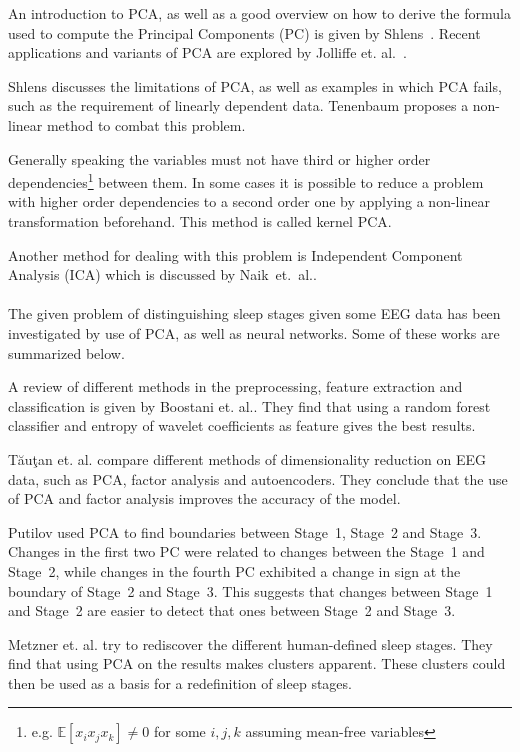 \documentclass[a4paper]{IEEEtran}
\begin{document}
An introduction to PCA, as well as a good overview on how to derive the formula used to compute the Principal Components (PC) is given by Shlens~\cite{Shlens2014}.
Recent applications and variants of PCA are explored by Jolliffe et. al.~\cite{Jolliffe2016}.

Shlens discusses the limitations of PCA, as well as examples in which PCA fails, such as the requirement of linearly dependent data.
Tenenbaum proposes a non-linear method to combat this problem\cite{Tenenbaum2000}.

Generally speaking the variables must not have third or higher order dependencies\footnote{e.g. $\mathbb{E}[x_ix_jx_k] \neq 0$ for some $i, j, k$ assuming mean-free variables} between them. In some cases it is possible to reduce a problem with higher order dependencies to a second order one by applying a non-linear transformation beforehand. This method is called kernel PCA\cite{Scholkopf1997}.

Another method for dealing with this problem is Independent Component Analysis (ICA) which is discussed by Naik~et.~al.\cite{Naik2011}.
\\
\\
The given problem of distinguishing sleep stages given some EEG data has been investigated by use of PCA, as well as neural networks. Some of these works are summarized below.

A review of different methods in the preprocessing, feature extraction and classification is given by Boostani et. al.\cite{Boostani2017}. They find that using a random forest classifier\cite{Breiman2001} and entropy of wavelet coefficients\cite{Chui1994} as feature gives the best results.

Tăuţan et. al.\cite{Tautan2021} compare different methods of dimensionality reduction on EEG data, such as PCA, factor analysis and autoencoders. They conclude that the use of PCA and factor analysis improves the accuracy of the model.

Putilov\cite{Putilov2015} used PCA to find boundaries between Stage~1, Stage~2 and Stage~3. Changes in the first two PC were related to changes between the Stage~1 and Stage~2, while changes in the fourth PC exhibited a change in sign at the boundary of Stage~2 and Stage~3. This suggests that changes between Stage~1 and Stage~2 are easier to detect that ones between Stage~2 and Stage~3.

Metzner et. al.\cite{Metzner2023} try to rediscover the different human-defined sleep stages. They find that using PCA on the results makes clusters apparent. These clusters could then be used as a basis for a redefinition of sleep stages.
\end{document}
